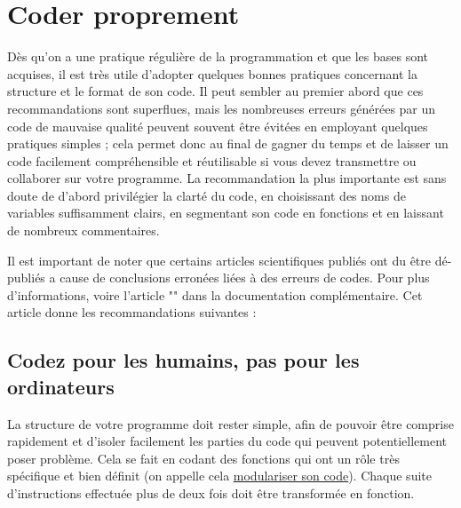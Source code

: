 \documentclass{article}
\begin{document}





\section{Coder proprement}

Dès qu'on a une pratique régulière de la programmation et que les bases sont acquises, il est très utile d'adopter quelques bonnes pratiques concernant la structure et le format de son code. Il peut sembler au premier abord que ces recommandations sont superflues, mais les nombreuses erreurs générées par un code de mauvaise qualité peuvent souvent être évitées en employant quelques pratiques simples ; cela permet donc au final de gagner du temps et de laisser un code facilement compréhensible et réutilisable si vous devez transmettre ou collaborer sur votre programme. La recommandation la plus importante est sans doute de d'abord privilégier la clarté du code, en choisissant des noms de variables suffisamment clairs, en segmentant son code en fonctions et en laissant de nombreux commentaires.

Il est important de noter que certains articles scientifiques publiés ont du être dé-publiés a cause de conclusions erronées liées à des erreurs de codes. Pour plus d'informations, voire l'article "" dans la documentation complémentaire. Cet article donne les recommandations suivantes :

\subsection{Codez pour les humains, pas pour les ordinateurs}
La structure de votre programme doit rester simple, afin de pouvoir être comprise rapidement et d'isoler facilement les parties du code qui peuvent potentiellement poser problème. Cela se fait en codant des fonctions qui ont un rôle très spécifique et bien définit (on appelle cela \href{https://fr.wikipedia.org/wiki/Programmation_modulaire}{modulariser son code}). Chaque suite d'instructions effectuée plus de deux fois doit être transformée en fonction.
\end{document}
